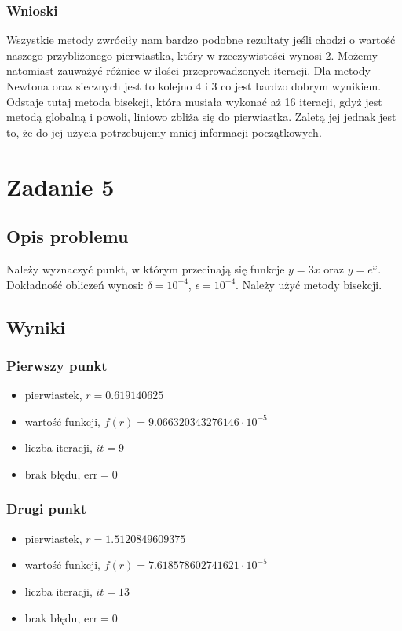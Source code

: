 \documentclass{article}
\begin{document}
\subsubsection*{Wnioski}
	Wszystkie metody zwróciły nam bardzo podobne rezultaty jeśli chodzi o wartość naszego przybliżonego pierwiastka, który w rzeczywistości wynosi 2. Możemy natomiast zauważyć różnice w ilości przeprowadzonych iteracji. Dla metody Newtona oraz siecznych jest to kolejno 4 i 3 co jest bardzo dobrym wynikiem. Odstaje tutaj metoda bisekcji, która musiała wykonać aż 16 iteracji, gdyż jest metodą globalną i powoli, liniowo zbliża się do pierwiastka. Zaletą jej jednak jest to, że do jej użycia potrzebujemy mniej informacji początkowych.

\clearpage

\section*{Zadanie 5}
\subsection*{Opis problemu}
	Należy wyznaczyć punkt, w którym przecinają się funkcje $y = 3x$ oraz $y = e^x$. Dokładność obliczeń wynosi: $\delta = 10^{-4}$, $\epsilon = 10^{-4}$. Należy użyć metody bisekcji.
\subsection*{Wyniki}
\subsubsection*{Pierwszy punkt}
	\begin{itemize}
		\item pierwiastek, $r = 0.619140625$
	    \item wartość funkcji, $f(r) = 9.066320343276146 \cdot 10^{-5}$
	    \item liczba iteracji, $it = 9$
	    \item brak błędu, $\mathrm{err} = 0$
	\end{itemize}
\subsubsection*{Drugi punkt}
	\begin{itemize}
		\item pierwiastek, $r = 1.5120849609375$
	    \item wartość funkcji, $f(r) = 7.618578602741621 \cdot 10^{-5}$
	    \item liczba iteracji, $it = 13$
	    \item brak błędu, $\mathrm{err} = 0$
	\end{itemize}
\end{document}
